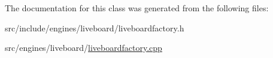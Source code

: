The documentation for this class was generated from the following files\+:\begin{DoxyCompactItemize}
\item 
src/include/engines/liveboard/liveboardfactory.\+h\item 
src/engines/liveboard/\mbox{\hyperlink{liveboardfactory_8cpp}{liveboardfactory.\+cpp}}\end{DoxyCompactItemize}
